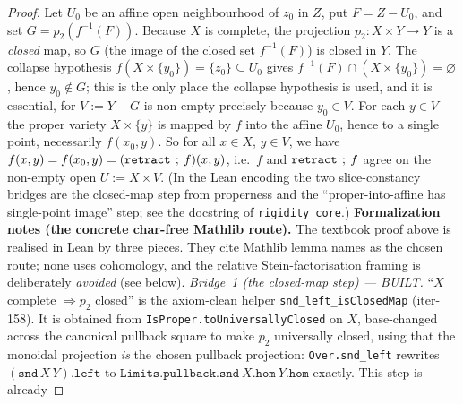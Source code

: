 \begin{proof}
  \leanok
  Let \(U_0\) be an affine open neighbourhood of \(z_0\) in \(Z\), put \(F = Z - U_0\), and set
  \(G = p_2(f^{-1}(F))\). Because \(X\) is complete, the projection \(p_2 \colon X \times Y \to Y\) is a
  \emph{closed} map, so \(G\) (the image of the closed set \(f^{-1}(F)\)) is closed in \(Y\). The
  collapse hypothesis \(f(X \times \{y_0\}) = \{z_0\} \subseteq U_0\) gives
  \(f^{-1}(F) \cap (X \times \{y_0\}) = \varnothing\), hence \(y_0 \notin G\); this is the only place
  the collapse hypothesis is used, and it is essential, for \(V := Y - G\) is non-empty precisely
  because \(y_0 \in V\). For each \(y \in V\) the proper variety \(X \times \{y\}\) is mapped by \(f\)
  into the affine \(U_0\), hence to a single point, necessarily \(f(x_0, y)\). So for all \(x \in X\),
  \(y \in V\), we have \(f(x, y) = f(x_0, y) = (\mathtt{retract} \fatsemi f)(x, y)\), i.e.\ \(f\) and
  \(\mathtt{retract} \fatsemi f\) agree on the non-empty open \(U := X \times V\). (In the Lean
  encoding the two slice-constancy bridges are the closed-map step from properness and the
  ``proper-into-affine has single-point image'' step; see the docstring of
  \texttt{rigidity\_core}.)
  \medskip
  \noindent\textbf{Formalization notes (the concrete char-free Mathlib route).} The textbook
  proof above is realised in Lean by three pieces. They cite Mathlib lemma names as the chosen
  route; none uses cohomology, and the relative Stein-factorisation framing is deliberately
  \emph{avoided} (see below).
  \emph{Bridge~1 (the closed-map step) --- BUILT.} ``\(X\) complete \(\Rightarrow p_2\) closed'' is
  the axiom-clean helper \texttt{snd\_left\_isClosedMap} (iter-158). It is obtained from
  \texttt{IsProper.toUniversallyClosed} on \(X\), base-changed across the canonical pullback square
  to make \(p_2\) universally closed, using that the monoidal projection \emph{is} the chosen
  pullback projection: \texttt{Over.snd\_left} rewrites \((\mathtt{snd}\,X\,Y).\mathtt{left}\) to
  \(\mathtt{Limits.pullback.snd}\ X.\mathtt{hom}\ Y.\mathtt{hom}\) exactly. This step is already

\end{proof}
